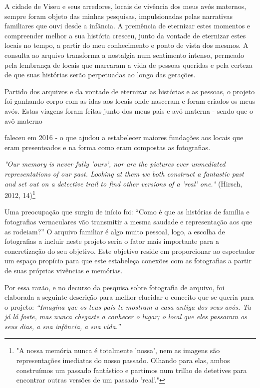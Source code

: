 \documentclass{article}
\begin{document}
A cidade de Viseu e seus arredores, locais de vivência dos meus avós maternos, 
sempre foram objeto das minhas pesquisas, impulsionadas pelas narrativas familiares que 
ouvi desde a infância. A premência de eternizar estes momentos e compreender melhor a 
sua história cresceu, junto da vontade de eternizar estes locais no tempo, a partir do meu 
conhecimento e ponto de vista dos mesmos. A consulta ao arquivo transforma a nostalgia 
num  sentimento  intenso,  permeado  pela  lembrança  de  locais  que  marcaram  a  vida  de 
pessoas  queridas  e  pela  certeza  de  que  suas  histórias  serão  perpetuadas  ao  longo  das 
gerações. 
 
Partido dos arquivos e da vontade de eternizar as histórias e as pessoas, o projeto 
foi ganhando corpo com as idas aos locais onde nasceram e foram criados os meus avós. 
Estas viagens foram feitas junto dos meus pais e avó materna - sendo que o avô materno 
 



faleceu  em  2016  -  o  que  ajudou  a  estabelecer  maiores  fundações  aos  locais  que  eram 
presenteados e na forma como eram compostas as fotografias. 
 
\textit{"Our memory is never fully 'ours', nor are the pictures ever unmediated representations }
\textit{of our past. Looking at them we both construct a fantastic past and set out on a }
\textit{detective trail to find other versions of a 'real' one."} (Hirsch, 2012, 14)\footnote{"A nossa memória nunca é totalmente 'nossa', nem as imagens são representações imediatas do nosso passado. Olhando para elas, ambos construímos um passado fantástico e partimos num trilho de detetives para encontrar outras versões de um passado 'real'." } 
 
Uma preocupação que surgiu de início foi: “Como é que as histórias de família e 
fotografias  vernaculares  vão  transmitir  a  mesma  saudade  e  representação  aos  que  as 
rodeiam?” O arquivo familiar é algo muito pessoal, logo, a escolha de fotografias a incluir 
neste  projeto  seria  o  fator  mais  importante  para  a  concretização  do  seu  objetivo.  Este 
objetivo  reside  em  proporcionar  ao  espectador  um  espaço  propício  para  que  este 
estabeleça conexões com as fotografias a partir de suas próprias vivências e memórias.   
 
Por essa razão, e no decurso da pesquisa sobre fotografia de arquivo, foi elaborada 
a  seguinte  descrição  para  melhor  elucidar  o  conceito  que  se  queria  para  o  projeto:
\textit{“Imagina que os teus pais te mostram a casa antiga dos seus avós. Tu já lá foste, mas }
\textit{nunca chegaste a conhecer o lugar; o local que eles passaram os seus dias, a sua infância, }
\textit{a sua vida.”}  
 
\end{document}
